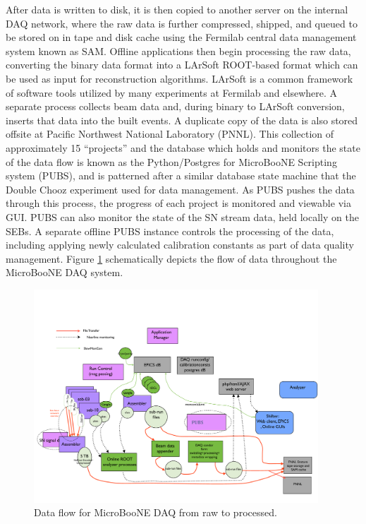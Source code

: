 After data is written to disk, it is then copied to another server on the internal DAQ network, where the raw data is further compressed, shipped, and queued to be stored on in tape and disk cache using the Fermilab central data management system known as SAM.  Offline applications then begin processing the raw data, converting the binary data format into a LArSoft \cite{larsoft} ROOT-based format which can be used as input for reconstruction algorithms.  LArSoft is a common framework of software tools utilized by many \lartpc experiments at Fermilab and elsewhere.  A separate process collects beam data and, during binary to LArSoft conversion, inserts that data into the built events. A duplicate copy of the data is also stored offsite at Pacific Northwest National Laboratory (PNNL). This collection of approximately 15 ``projects''  and the database which holds and monitors the state of the data flow is known as the Python/Postgres for MicroBooNE Scripting system (PUBS), and is patterned after a similar database state machine that the Double Chooz experiment used for data management.  As PUBS pushes the data through this process, the progress of each project is monitored and viewable via GUI. PUBS can also monitor the state of the SN stream data, held locally on the SEBs.  A separate offline PUBS instance controls the processing of the data, including applying newly calculated calibration constants as part of data quality management.  Figure \ref{fig:dataflow} schematically depicts the flow of data throughout the MicroBooNE DAQ system.

\begin{figure}
\centering
\includegraphics[width=0.95\textwidth]{./figures/dataFlow.pdf}
\caption{Data flow for MicroBooNE DAQ from raw to processed.}
\label{fig:dataflow}
\end{figure}


